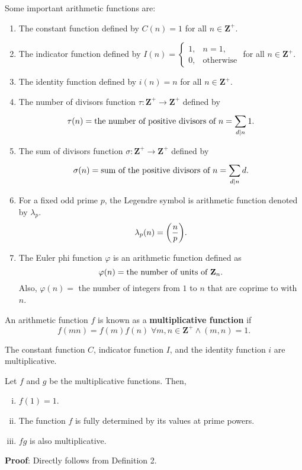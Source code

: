 Some important arithmetic functions are:
\begin{enumerate}[(1)]
    \item The constant function defined by $ C(n)=1 $ for all $ n\in\mathbf{Z}^+ $.
    \item The indicator function defined by $ I(n)=\begin{cases}
                  1, & n=1,             \\
                  0, & \text{otherwise}
              \end{cases} $
          for all $ n\in\mathbf{Z}^+ $.
    \item The identity function defined by $ i(n)=n $ for all $ n\in\mathbf{Z}^+ $.
    \item The number of divisors function $ \tau\colon \mathbf{Z}^+\to\mathbf{Z}^+ $ defined by
          \[ \tau(n)=\text{the number of positive divisors of $ n $}=\sum_{d\mid n}^{}1. \]
    \item The sum of divisors function $ \sigma\colon\mathbf{Z}^+\to\mathbf{Z}^+ $ defined by
          \[ \sigma(n)=\text{sum of the positive divisors of $ n $}=\sum_{d\mid n}^{}d. \]
    \item For a fixed odd prime $ p $, the Legendre symbol is arithmetic function denoted by $ \lambda_p $.
          \[ \lambda_p(n)=\biggl(\dfrac{n}{p}\biggr). \]
    \item The Euler phi function $ \varphi $ is an arithmetic function defined as
          \[ \varphi(n)=\text{the number of units of $ \mathbf{Z}_n $}. \]
          Also, $ \varphi(n)= $ the number of integers from $ 1 $ to $ n $ that are coprime to with $ n $.
\end{enumerate}
\begin{Definition}{}{}
    An arithmetic function $ f $ is known as a \textbf{multiplicative function} if
    \[ f(mn)=f(m)f(n)\; \forall m,n\in\mathbf{Z}^+\land (m,n)=1. \]
\end{Definition}
The constant function $ C $, indicator function $ I $, and the identity function $ i $ are multiplicative.
\begin{Proposition}{}{}
    Let $ f $ and $ g $ be the multiplicative functions. Then,
    \begin{enumerate}[i.]
        \item $ f(1)=1 $.
        \item The function $ f $ is fully determined by its values at prime powers.
        \item $ fg $ is also multiplicative.
    \end{enumerate}
    \tcblower{}
    \textbf{Proof}: Directly follows from Definition 2.
\end{Proposition}
